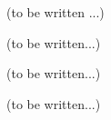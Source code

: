 (to be written ...)



\modHeadsection{\TBW}
(to be written...)




(to be written...)



\modHeadsection{\TBW}
(to be written...)




\begin{appendices}

\end{appendices}
